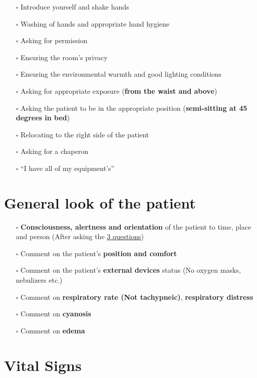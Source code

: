 \documentclass[
  13.5pt,
  a4paper,
  DIV=11,
  numbers=noendperiod]{scrreprt}
\providecommand{\tightlist}{%
  \setlength{\itemsep}{0pt}\setlength{\parskip}{0pt}}
\begin{document}
\begin{itemize}
\tightlist
\item[$\square$]
  Introduce yourself and shake hands
\item[$\square$]
  Washing of hands and appropriate hand hygiene
\item[$\square$]
  Asking for permission
\item[$\square$]
  Ensuring the room's privacy
\item[$\square$]
  Ensuring the environmental warmth and good lighting conditions
\item[$\square$]
  Asking for appropriate exposure (\textbf{from the waist and above})
\item[$\square$]
  Asking the patient to be in the appropriate position
  (\textbf{semi-sitting at 45 degrees in bed})
\item[$\square$]
  Relocating to the right side of the patient
\item[$\square$]
  Asking for a chaperon
\item[$\square$]
  ``I have all of my equipment's''
\end{itemize}

\section{General look of the patient}\label{general-look-of-the-patient}

\begin{itemize}
\tightlist
\item[$\square$]
  \textbf{Consciousness, alertness and orientation} of the patient to
  time, place and person (After asking the \href{miscellaneous.qmd}{3
  questions})
\item[$\square$]
  Comment on the patient's \textbf{position and comfort}
\item[$\square$]
  Comment on the patient's \textbf{external devices} status (No oxygen
  masks, nebulizers etc.)
\item[$\square$]
  Comment on \textbf{respiratory rate (Not tachypneic)},
  \textbf{respiratory distress}
\item[$\square$]
  Comment on \textbf{cyanosis}
\item[$\square$]
  Comment on \textbf{edema}
\end{itemize}

\section{Vital Signs}\label{vital-signs}
\end{document}
